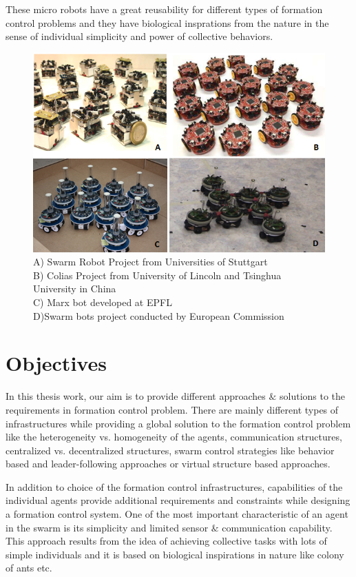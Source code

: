 These micro robots have a great reusability for different types of formation control problems  and they have biological insprations from the nature in the sense of individual simplicity and power of collective behaviors.

\begin{figure}[H]
\captionsetup{format=hang,justification=centerfirst}
\caption{A) Swarm Robot Project from Universities of Stuttgart  \\
B) Colias Project from University of Lincoln and Tsinghua\\ University in China\\
C) Marx bot developed at EPFL \\
D)Swarm bots project conducted by  European Commission}
\centering
\includegraphics[scale = 1]{mobilerobots}
\end{figure}

\section{Objectives}
In this thesis work, our aim is to provide different approaches $\&$ solutions to the requirements in formation control problem.  There are mainly different types of  infrastructures while providing a global solution to the formation control problem like the heterogeneity vs. homogeneity of the agents, communication structures, centralized vs. decentralized structures, swarm control strategies like behavior based and leader-following approaches or virtual structure based approaches. 

In addition to choice of the formation control infrastructures, capabilities of the individual agents provide additional requirements and constraints while designing a formation control system. One of the most important characteristic of an agent in the swarm is its simplicity and limited sensor $\&$ communication capability. This approach results from the idea of achieving collective tasks with lots of simple individuals  and it is based on biological inspirations in nature like colony of ants etc.

